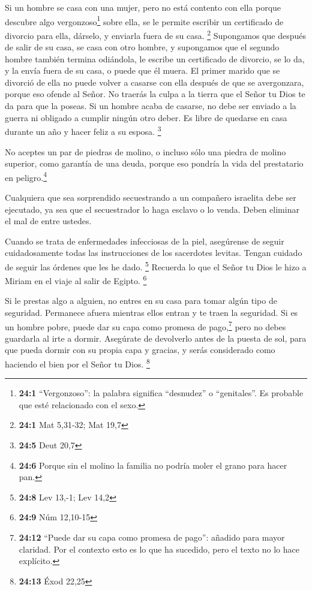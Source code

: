 Si un hombre se casa con una mujer, pero no está contento
con ella porque descubre algo vergonzoso\footnote{\textbf{24:1}
  ``Vergonzoso'': la palabra significa ``desnudez'' o ``genitales''. Es
  probable que esté relacionado con el sexo.} sobre ella, se le permite
escribir un certificado de divorcio para ella, dárselo, y enviarla fuera
de su casa. \footnote{\textbf{24:1} Mat 5,31-32; Mat 19,7}
 Supongamos que después de salir de su casa, se casa con
otro hombre,  y supongamos que el segundo hombre también
termina odiándola, le escribe un certificado de divorcio, se lo da, y la
envía fuera de su casa, o puede que él muera.  El primer
marido que se divorció de ella no puede volver a casarse con ella
después de que se avergonzara, porque eso ofende al Señor. No traerás la
culpa a la tierra que el Señor tu Dios te da para que la poseas.
 Si un hombre acaba de casarse, no debe ser enviado a la
guerra ni obligado a cumplir ningún otro deber. Es libre de quedarse en
casa durante un año y hacer feliz a su esposa. \footnote{\textbf{24:5}
  Deut 20,7}

 No aceptes un par de piedras de molino, o incluso sólo
una piedra de molino superior, como garantía de una deuda, porque eso
pondría la vida del prestatario en peligro.\footnote{\textbf{24:6}
  Porque sin el molino la familia no podría moler el grano para hacer
  pan.}

 Cualquiera que sea sorprendido secuestrando a un
compañero israelita debe ser ejecutado, ya sea que el secuestrador lo
haga esclavo o lo venda. Deben eliminar el mal de entre ustedes.

 Cuando se trata de enfermedades infecciosas de la piel,
asegúrense de seguir cuidadosamente todas las instrucciones de los
sacerdotes levitas. Tengan cuidado de seguir las órdenes que les he
dado. \footnote{\textbf{24:8} Lev 13,-1; Lev 14,2} 
Recuerda lo que el Señor tu Dios le hizo a Miriam en el viaje al salir
de Egipto. \footnote{\textbf{24:9} Núm 12,10-15}

 Si le prestas algo a alguien, no entres en su casa para
tomar algún tipo de seguridad.  Permanece afuera mientras
ellos entran y te traen la seguridad.  Si es un hombre
pobre, puede dar su capa como promesa de pago,\footnote{\textbf{24:12}
  ``Puede dar su capa como promesa de pago'': añadido para mayor
  claridad. Por el contexto esto es lo que ha sucedido, pero el texto no
  lo hace explícito.} pero no debes guardarla al irte a dormir.
 Asegúrate de devolverlo antes de la puesta de sol, para
que pueda dormir con su propia capa y gracias, y serás considerado como
haciendo el bien por el Señor tu Dios. \footnote{\textbf{24:13} Éxod
  22,25}

